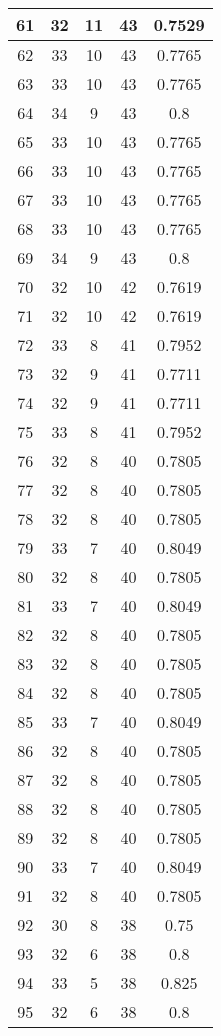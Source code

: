 \documentclass[letterpaper, 12pt]{article}
\begin{document}
\begin{longtable}{|c|c|c|c|c|}
\hline
61 & 32 & 11 & 43 & 0.7529 \\
\hline
62 & 33 & 10 & 43 & 0.7765 \\
\hline
63 & 33 & 10 & 43 & 0.7765 \\
\hline
64 & 34 & 9 & 43 & 0.8 \\
\hline
65 & 33 & 10 & 43 & 0.7765 \\
\hline
66 & 33 & 10 & 43 & 0.7765 \\
\hline
67 & 33 & 10 & 43 & 0.7765 \\
\hline
68 & 33 & 10 & 43 & 0.7765 \\
\hline
69 & 34 & 9 & 43 & 0.8 \\
\hline
70 & 32 & 10 & 42 & 0.7619 \\
\hline
71 & 32 & 10 & 42 & 0.7619 \\
\hline
72 & 33 & 8 & 41 & 0.7952 \\
\hline
73 & 32 & 9 & 41 & 0.7711 \\
\hline
74 & 32 & 9 & 41 & 0.7711 \\
\hline
75 & 33 & 8 & 41 & 0.7952 \\
\hline
76 & 32 & 8 & 40 & 0.7805 \\
\hline
77 & 32 & 8 & 40 & 0.7805 \\
\hline
78 & 32 & 8 & 40 & 0.7805 \\
\hline
79 & 33 & 7 & 40 & 0.8049 \\
\hline
80 & 32 & 8 & 40 & 0.7805 \\
\hline
81 & 33 & 7 & 40 & 0.8049 \\
\hline
82 & 32 & 8 & 40 & 0.7805 \\
\hline
83 & 32 & 8 & 40 & 0.7805 \\
\hline
84 & 32 & 8 & 40 & 0.7805 \\
\hline
85 & 33 & 7 & 40 & 0.8049 \\
\hline
86 & 32 & 8 & 40 & 0.7805 \\
\hline
87 & 32 & 8 & 40 & 0.7805 \\
\hline
88 & 32 & 8 & 40 & 0.7805 \\
\hline
89 & 32 & 8 & 40 & 0.7805 \\
\hline
90 & 33 & 7 & 40 & 0.8049 \\
\hline
91 & 32 & 8 & 40 & 0.7805 \\
\hline
92 & 30 & 8 & 38 & 0.75 \\
\hline
93 & 32 & 6 & 38 & 0.8 \\
\hline
94 & 33 & 5 & 38 & 0.825 \\
\hline
95 & 32 & 6 & 38 & 0.8 \\

\end{longtable}
\end{document}
